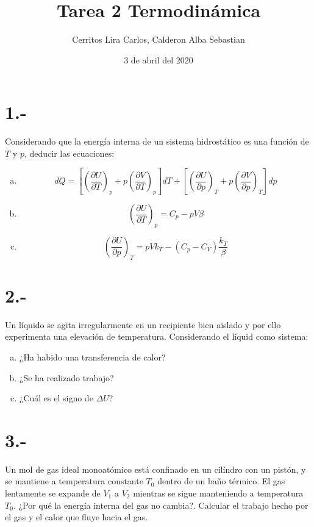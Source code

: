 \documentclass{article}
\title{Tarea 2 Termodinámica}
\author{Cerritos Lira Carlos, Calderon Alba Sebastian}
\date{3 de abril del 2020}
\begin{document}
\maketitle
\section*{1.-}
Considerando que la energía interna de un sistema hidrostático es una función de $T$ y $p$, 
deducir las ecuaciones:
\begin{enumerate}[a)]
    \item \[ dQ 
    = \left[ \left( \frac{\partial U}{\partial T}\right)_p + p\left( \frac{\partial V}{\partial T} \right)_p \right] dT
    + \left[ \left(\frac{\partial U }{\partial p}\right)_T + p\left( \frac{\partial V}{\partial p} \right)_T \right] dp \]
    \item \[ \left(\frac{\partial U}{\partial T}\right)_p 
    = C_p - pV\beta \]
    \item \[ \left( \frac{\partial U}{\partial p}\right)_T 
    = pVk_T - (C_p-C_V)\frac{k_T}{\beta} \]
\end{enumerate}
\begin{tcolorbox}[breakable]
    
\end{tcolorbox}

\section*{2.-}
Un líquido se agita irregularmente en un recipiente bien aislado y por ello experimenta 
una elevación de temperatura. Considerando el líquid como sistema:
\begin{enumerate}[a)]
    \item ¿Ha habido una transferencia de calor? 
    \item ¿Se ha realizado trabajo?
    \item ¿Cuál es el signo de $\Delta U$?
\end{enumerate}
\begin{tcolorbox}[breakable]
    
\end{tcolorbox}

\section*{3.-} 
Un mol de gas ideal monoatómico está confinado en un cilíndro con un pistón, y se mantiene 
a temperatura constante $T_0$ dentro de un baño térmico. El gas lentamente se expande de
$V_1$ a $V_2$ mientras se sigue manteniendo a temperatura $T_0$. ¿Por qué la energía interna 
del gas no cambia?. Calcular el trabajo hecho por el gas y el calor que fluye hacia el gas.
\begin{tcolorbox}[breakable]
    
\end{tcolorbox}
\end{document}
